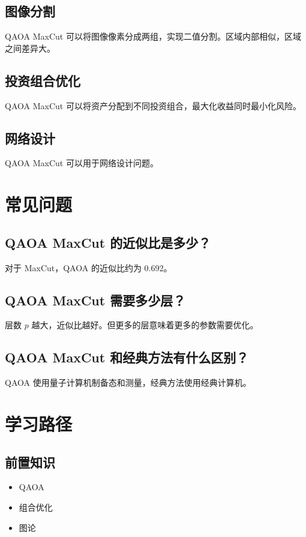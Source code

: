 \documentclass[12pt,a4paper]{article}
\begin{document}
\subsection{图像分割}

QAOA MaxCut 可以将图像像素分成两组，实现二值分割。区域内部相似，区域之间差异大。

\subsection{投资组合优化}

QAOA MaxCut 可以将资产分配到不同投资组合，最大化收益同时最小化风险。

\subsection{网络设计}

QAOA MaxCut 可以用于网络设计问题。

\section{常见问题}

\subsection{QAOA MaxCut 的近似比是多少？}

对于 MaxCut，QAOA 的近似比约为 0.692。

\subsection{QAOA MaxCut 需要多少层？}

层数 $p$ 越大，近似比越好。但更多的层意味着更多的参数需要优化。

\subsection{QAOA MaxCut 和经典方法有什么区别？}

QAOA 使用量子计算机制备态和测量，经典方法使用经典计算机。

\section{学习路径}

\subsection{前置知识}
\begin{itemize}
  \item QAOA
  \item 组合优化
  \item 图论
\end{itemize}
\end{document}
